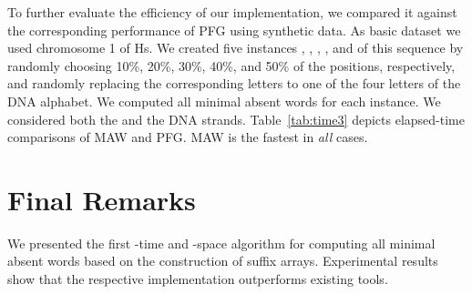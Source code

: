 \documentclass{llncs}
\begin{document}
  To further evaluate the efficiency of our implementation, we compared
it against the corresponding performance of \textsf{PFG} using synthetic
data.
  As basic dataset we used chromosome 1 of Hs. 
  We created five instances , , 
, , and  of this
sequence by randomly choosing 10\%, 20\%, 30\%, 40\%, and 50\% of 
the positions, respectively, and randomly replacing the corresponding
letters to one of the four letters of the DNA alphabet.
  We computed all minimal absent words for each instance. 
  We considered both the  and the  
DNA strands.
  Table~\ref{tab:time3} depicts elapsed-time comparisons of 
\textsf{MAW} and \textsf{PFG}.
  \textsf{MAW} is the fastest in {\em all} cases.

\begin{table}[!ht]
\vspace{0.25cm}
\begin{center}
\end{center}
\caption{Elapsed-time comparison of \textsf{MAW} and \textsf{PFG}
for computing all minimal absent words in synthetic data}
\label{tab:time3}
\end{table}
\section{Final Remarks}
\label{sec:conc}
  We presented the first -time and -space algorithm for computing all minimal absent words based on the construction of suffix arrays. 
  Experimental results show that the respective implementation outperforms existing tools.


\end{document}
